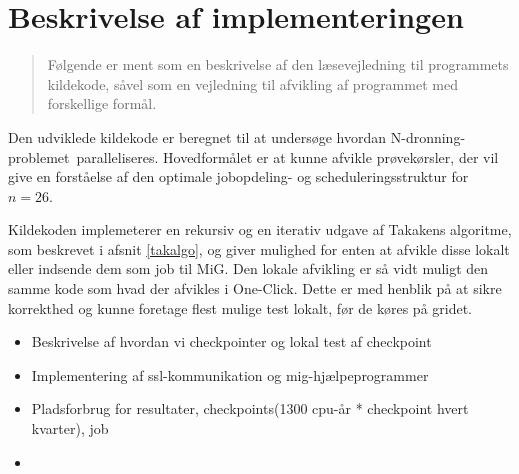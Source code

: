 \documentclass[pdf,draft,a4paper,11pt]{article}
\newcommand{\mig}{MiG}
\newcommand{\oc}{One-Click}
\newcommand{\nq}{N-dronning-problemet}
\begin{document}
\section{Beskrivelse af implementeringen}\label{implementering}
\begin{verse}
	Følgende er ment som en beskrivelse af den læsevejledning til programmets kildekode, såvel som en vejledning til afvikling af programmet med forskellige formål. 
\end{verse}

Den udviklede kildekode er beregnet til at undersøge hvordan \nq\ paralleliseres. Hovedformålet er at kunne afvikle prøvekørsler, der vil give en forståelse af den optimale jobopdeling- og scheduleringsstruktur for $n=26$.

Kildekoden implemeterer en rekursiv og en iterativ udgave af Takakens algoritme, som beskrevet i afsnit \ref{takalgo}, og giver mulighed for enten at afvikle disse lokalt eller indsende dem som job til \mig. Den lokale afvikling er så vidt muligt den samme kode som hvad der afvikles i \oc. Dette er med henblik på at sikre korrekthed og kunne foretage flest mulige test lokalt, før de køres på gridet. 

\begin{itemize}
	\item Beskrivelse af hvordan vi checkpointer og lokal test af checkpoint 
	\item Implementering af ssl-kommunikation og mig-hjælpeprogrammer 
	\item Pladsforbrug for resultater, checkpoints(1300 cpu-år * checkpoint hvert kvarter), job
	\item 
\end{itemize}
\end{document}
